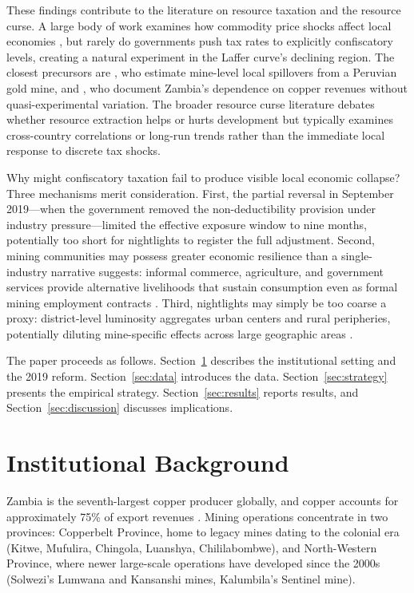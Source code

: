 \documentclass[12pt]{article}
\begin{document}
These findings contribute to the literature on resource taxation and the resource curse. A large body of work examines how commodity price shocks affect local economies \citep{allcott2018dutch,dube2013commodity,berman2017mining}, but rarely do governments push tax rates to explicitly confiscatory levels, creating a natural experiment in the Laffer curve's declining region. The closest precursors are \citet{aragon2013natural}, who estimate mine-level local spillovers from a Peruvian gold mine, and \citet{manley2017how}, who document Zambia's dependence on copper revenues without quasi-experimental variation. The broader resource curse literature \citep{sachs2001curse,venables2016using,ross2015oil,caselli2013resource} debates whether resource extraction helps or hurts development but typically examines cross-country correlations or long-run trends rather than the immediate local response to discrete tax shocks.

Why might confiscatory taxation fail to produce visible local economic collapse? Three mechanisms merit consideration. First, the partial reversal in September 2019---when the government removed the non-deductibility provision under industry pressure---limited the effective exposure window to nine months, potentially too short for nightlights to register the full adjustment. Second, mining communities may possess greater economic resilience than a single-industry narrative suggests: informal commerce, agriculture, and government services provide alternative livelihoods that sustain consumption even as formal mining employment contracts \citep{hodler2014regional,michalopoulos2014national}. Third, nightlights may simply be too coarse a proxy: district-level luminosity aggregates urban centers and rural peripheries, potentially diluting mine-specific effects across large geographic areas \citep{henderson2012measuring}.

The paper proceeds as follows. Section~\ref{sec:background} describes the institutional setting and the 2019 reform. Section~\ref{sec:data} introduces the data. Section~\ref{sec:strategy} presents the empirical strategy. Section~\ref{sec:results} reports results, and Section~\ref{sec:discussion} discusses implications.

\section{Institutional Background}
\label{sec:background}

Zambia is the seventh-largest copper producer globally, and copper accounts for approximately 75\% of export revenues \citep{worldbank2020zambia}. Mining operations concentrate in two provinces: Copperbelt Province, home to legacy mines dating to the colonial era (Kitwe, Mufulira, Chingola, Luanshya, Chililabombwe), and North-Western Province, where newer large-scale operations have developed since the 2000s (Solwezi's Lumwana and Kansanshi mines, Kalumbila's Sentinel mine).
\end{document}
